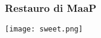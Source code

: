 \begin{frame}
\frametitle{Restauro di MaaP}
\begin{center}
\texttt{[image: sweet.png]}
\end{center}
\end{frame}

